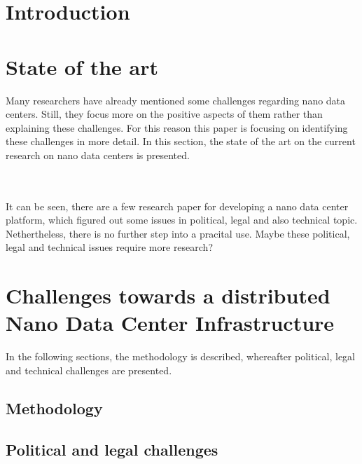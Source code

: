 
\section{Introduction}


\section{State of the art}
\label{StateOfTheArt}
Many researchers have already mentioned some challenges regarding nano data centers. Still, they focus more on the positive aspects of them rather than explaining these challenges. For this reason this paper is focusing on identifying these challenges in more detail. In this section, the state of the art on the current research on nano data centers is presented. 



\\ \\
It can be seen, there are a few research paper for developing a nano data center platform, which figured out some issues in political, legal and also technical topic. Nethertheless, there is no further step into a pracital use. Maybe these political, legal and technical issues require more research?

\section{Challenges towards a distributed Nano Data Center Infrastructure}
\label{sec:challenges}
In the following sections, the methodology is described, whereafter political, legal and technical challenges are presented.

\subsection{Methodology}



\subsection{Political and legal challenges}


